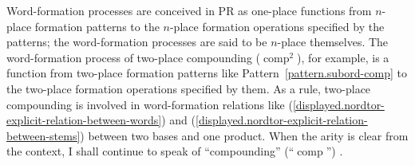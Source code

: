 \documentclass[output=paper
  ,nobabel
  ,draftmode
  ,colorlinks, citecolor=brown
]{langscibook}
\begin{document}
Word-formation processes are conceived in PR as one-place functions from
$n$-place formation patterns to the $n$-place formation operations specified by the patterns; the
word-formation processes are said to be $n$-place themselves. The word-formation process of two-place
compounding ($\operatorname{comp}^{2}$), for example, is a function from two-place formation patterns like
Pattern \ref{pattern.subord-comp} to the two-place
formation operations specified by them. As a rule, two-place compounding is
involved in word-formation relations like (\ref{displayed.nordtor-explicit-relation-between-words}) and (\ref{displayed.nordtor-explicit-relation-between-stems})
between two bases and one product. When the arity is clear from the context, I
shall continue to speak of ``compounding''
(``$\operatorname{comp}$'') \emph{}.
\end{document}
